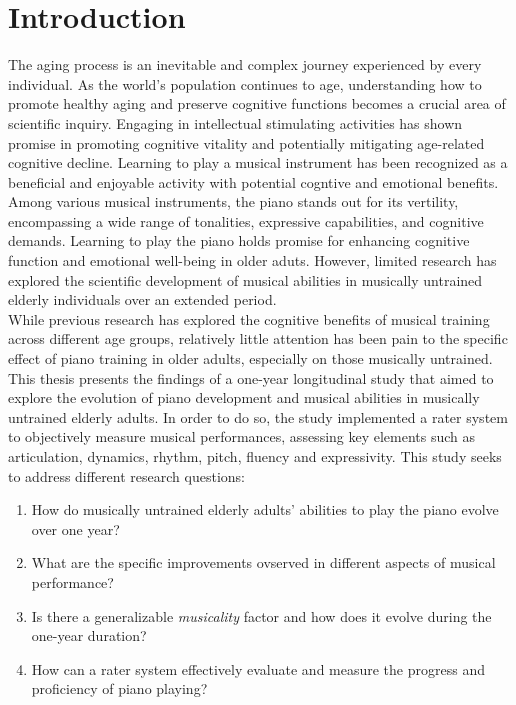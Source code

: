 \chapter{Introduction}

The aging process is an inevitable and complex journey experienced by every individual. As the world's population continues to age, understanding how to promote healthy aging and preserve cognitive functions becomes a crucial area of scientific inquiry. Engaging in intellectual stimulating activities has shown promise in promoting cognitive vitality and potentially mitigating age-related cognitive decline. Learning to play a musical instrument has been recognized as a beneficial and enjoyable activity with potential cogntive and emotional benefits. Among various musical instruments, the piano stands out for its vertility, encompassing a wide range of tonalities, expressive capabilities, and cognitive demands. Learning to play the piano holds promise for enhancing cognitive function and emotional well-being in older aduts. However, limited research has explored the scientific development of musical abilities in musically untrained elderly individuals over an extended period.\\
While previous research has explored the cognitive benefits of musical training across different age groups, relatively little attention has been pain to the specific effect of piano training in older adults, especially on those musically untrained. This thesis presents the findings of a one-year longitudinal study that aimed to explore the evolution of piano development and musical abilities in musically untrained elderly adults. In order to do so, the study implemented a rater system to objectively measure musical performances, assessing key elements such as articulation, dynamics, rhythm, pitch, fluency and expressivity. 
This study seeks to address different research questions: 
\begin{enumerate}
\item How do musically untrained elderly adults' abilities to play the piano evolve over one year?
\item What are the specific improvements ovserved in different aspects of musical performance?
\item Is there a generalizable \textit{musicality} factor and how does it evolve during the one-year duration?
\item How can a rater system effectively evaluate and measure the progress and proficiency of piano playing?
\end{enumerate}

